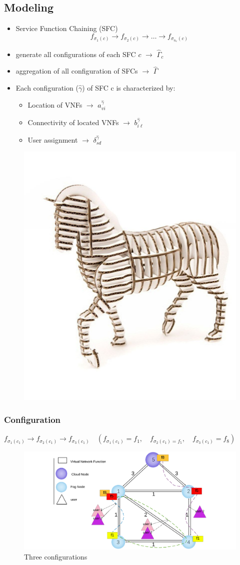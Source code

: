 \documentclass{beamer}
\begin{document}
\subsection{Modeling}
\begin{frame}
	\begin{itemize}
		\item <1-> {Service Function Chaining (SFC)
	\begin{equation}
	[SFC\: c]\quad f_{\sigma_{1}(c)} \to f_{\sigma_{2}(c)} \to \dots \to f_{\sigma_{n_c}(c)}
	\end{equation}}
		\item <2-> {generate all configurations of each SFC $c$  $\to$ $\hat{\Gamma}_c$}
		\item <3-> {aggregation of all configuration of SFCs $\to$ $\hat{\Gamma}$}
		\item <4-> {Each configuration ($\hat{\gamma}$) of SFC c is characterized by:}
		\begin{itemize}
			\item <4-> {Location of VNFs $\to$ $a^{\hat{\gamma}}_{vi}$}
			\item <5-> {Connectivity of located VNFs $\to$ $b^{\hat{\gamma}}_{i\ell}$}
			\item <6-> {User assignment $\to$ $\delta^{\hat{\gamma}}_{sd}$}
		\end{itemize}
	\end{itemize}
		
\begin{figure}
	\centering
	\includegraphics[width=0.3\linewidth]{modeling}
	\caption{}
	\label{fig:modeling}
\end{figure}
\end{frame}
\begin{frame}
	\frametitle{Configuration}
	$f_{\sigma_{1}(c_1)} \to f_{\sigma_{2}(c_1)}  \to f_{\sigma_{3}(c_1)}\quad (f_{\sigma_{1}(c_1)}=f_1,\quad f_{\sigma_{2}(c_1)=f_5},\quad f_{\sigma_{3}(c_1)}=f_8)$
	
	
\begin{figure}
	\centering
	\includegraphics[width=0.9\linewidth]{"Copy of Network Diagram Template"}
	\caption{
		Three configurations
	}
	\label{fig:copy-of-network-diagram-template}
\end{figure}
\end{frame}
\end{document}
